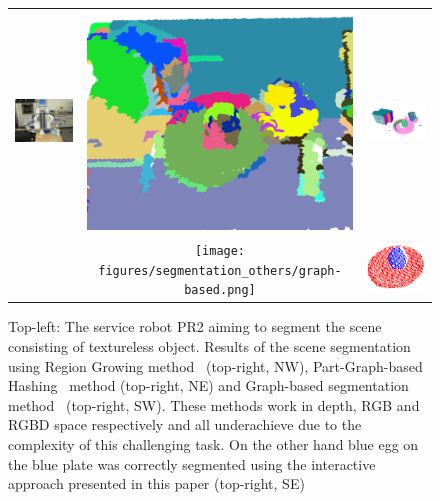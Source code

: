 \setlength{\tabcolsep}{0.1em}
\begin{figure}[ht]
\begin{tabular}{cccc}
\multicolumn{2}{c}{\multirow{-6}{*}{\includegraphics[width=0.5\columnwidth]{figures/teaser/IMG_0395.JPG}
}} & \includegraphics[width=0.23\columnwidth]{figures/segmentation_others/region_growing_rgb.png} 
&\includegraphics[width=0.23\columnwidth]{figures/segmentation_others/part-graph-hashing.png} \\
\multicolumn{2}{c}{} & \texttt{[image: figures/segmentation\_others/graph-based.png]} &\includegraphics[width=0.23\columnwidth]{pictures/teaser_egg_result-cropped.png} 
\end{tabular}
\caption{Top-left: The service robot PR2 aiming to segment the scene
  consisting of textureless object. Results  of  the   scene segmentation
  using Region  Growing  method~\cite{RGBRegionGrowing} (top-right, NW), Part-Graph-based 
  Hashing~\cite{marton12SC} method (top-right, NE) and Graph-based  
  segmentation method~\cite{Felzenszwalb}   (top-right, SW). These methods work in depth, RGB and RGBD 
  space respectively and all underachieve due to the complexity of this challenging task. 
  On the other hand blue egg on the blue plate was correctly segmented using the interactive approach presented in this paper (top-right, SE)}
\label{fig:tracking_dists}
\end{figure}









